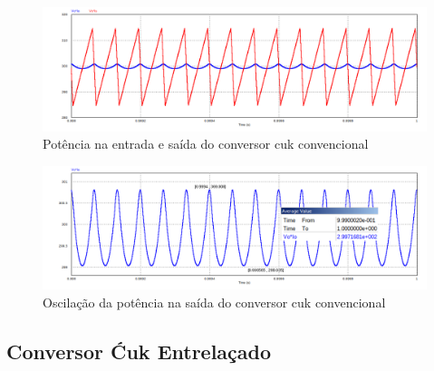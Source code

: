 \documentclass[
	12pt,				%
	openany,
	onseside,
	a4paper,			%
	english,			%
	french,				%
	spanish,			%
	brazil,				%
	]{abntex2}
\begin{document}
\begin{figure}[H]%
	\centering
		\includegraphics[width= \linewidth]{cuk_conv_power_sign}
		\caption{Potência na entrada e saída do conversor cuk convencional}
		\label{fig:cuk_conv_power_sign}
\end{figure}
\vspace{-5pt}
\begin{figure}[H]%
	\centering
		\includegraphics[width= \linewidth]{cuk_conv_power_sign_out}
		\caption{Oscilação da potência na saída do conversor cuk convencional}
		\label{fig:cuk_conv_power_sign_out}
\end{figure}
\vspace{-5pt}
\subsection{Conversor Ćuk Entrelaçado}
\end{document}
